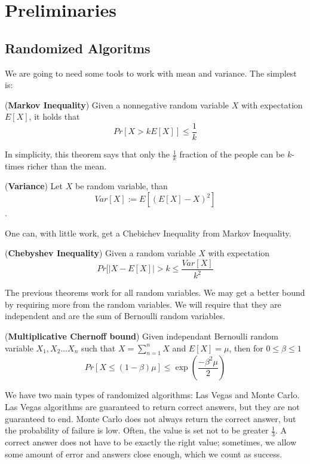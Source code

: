 \chapter{Preliminaries}\label{preliminaries}
\section{Randomized Algoritms}
We are going to need some tools to work with mean and variance. The simplest is:
\begin{thm}
    (\textbf{Markov Inequality}) Given a nonnegative random variable $X$ with expectation $E[X]$, it holds that $$ Pr[X > kE[X]]\leq \frac{1}{k}$$
\end{thm}
In simplicity, this theorem says that only the $\frac{1}{k}$ fraction of the people can be $k$-times richer than the mean.  

\begin{defn}
    (\textbf{Variance}) Let $X$ be random variable, than $$Var[X] := E[(E[X] - X)^2]$$.   
\end{defn}


One can, with little work, get a Chebichev Inequality from Markov Inequality.
\begin{thm}
(\textbf{Chebyshev Inequality})  Given a  random variable $X$ with expectation $$Pr[|X-E[X]| > k \leq \frac{Var[X]}{k^2}$$
\end{thm}

The previous theorems work for all random variables. We may get a better bound by requiring more from the random variables. We will require that they are independent and are the sum of Bernoulli random variables.

\begin{thm}
    (\textbf{Multiplicative Chernoff bound})  Given independant Bernoulli random variable $X_1, X_2 \dots X_n$ such that $X = \sum_{n=1}^nX$ and $E[X] = \mu$, then for $0 \leq \beta \leq 1$ 
    $$Pr[X \leq (1 - \beta)\mu] \leq \exp \left( \frac{-\beta^2\mu}{2} \right)$$
\end{thm}

We have two main types of randomized algorithms: Las Vegas and Monte Carlo.
Las Vegas algorithms are guaranteed to return correct answers, but they are not guaranteed to end.
Monte Carlo does not always return the correct answer, but the probability of failure is low. Often, the value is set not to be greater $\frac{1}{3}$. A correct answer does not 
have to be exactly the right value; sometimes, we allow some amount of error and answers close enough, which we count as success.

